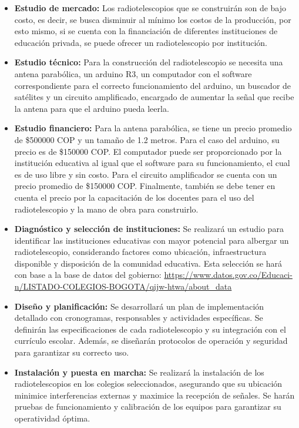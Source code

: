 \begin{itemize}

\item \textbf{Estudio de mercado:} Los radiotelescopios que se construirán
son de bajo costo, es decir, se busca disminuir al mínimo los costos de la
producción, por esto mismo, si se cuenta con la financiación de diferentes
instituciones de educación privada, se puede ofrecer un radiotelescopio por
institución.

\item \textbf{Estudio técnico:} Para la construcción del radiotelescopio se
necesita una antena parabólica, un arduino R3, un computador con el software
correspondiente para el correcto funcionamiento del arduino, un buscador de
satélites y un circuito amplificado, encargado de aumentar la señal que recibe
la antena para que el arduino pueda leerla.

\item \textbf{Estudio financiero:} Para la antena parabólica, se tiene un precio
promedio de \$500000 COP y un tamaño de 1.2 metros. Para el caso del arduino, su
precio es de \$150000 COP. El computador puede ser proporcionado por la
institución educativa al igual que el software para su funcionamiento, el cual
es de uso libre y sin costo. Para el circuito amplificador se cuenta con un
precio promedio de \$150000 COP. Finalmente, también se debe tener en cuenta el
precio por la capacitación de los docentes para el uso del radiotelescopio y la
mano de obra para construirlo.

\item \textbf{Diagnóstico y selección de instituciones:} Se realizará un estudio
para identificar las instituciones educativas con mayor potencial para albergar
un radiotelescopio, considerando factores como ubicación, infraestructura
disponible y disposición de la comunidad educativa. Esta selección se hará con
base a la base de datos del gobierno:
\url{https://www.datos.gov.co/Educaci-n/LISTADO-COLEGIOS-BOGOTA/qijw-htwa/about_data}

\item \textbf{Diseño y planificación:} Se desarrollará un plan de implementación
detallado con cronogramas, responsables y actividades específicas. Se definirán
las especificaciones de cada radiotelescopio y su integración con el currículo
escolar.
Además, se diseñarán protocolos de operación y seguridad para garantizar su
correcto uso.

\item \textbf{Instalación y puesta en marcha:}  Se realizará la instalación de
los radiotelescopios en los colegios seleccionados, asegurando que su ubicación
minimice interferencias externas y maximice la recepción de señales. Se harán
pruebas de funcionamiento y calibración de los equipos para garantizar su
operatividad óptima.


\end{itemize}
